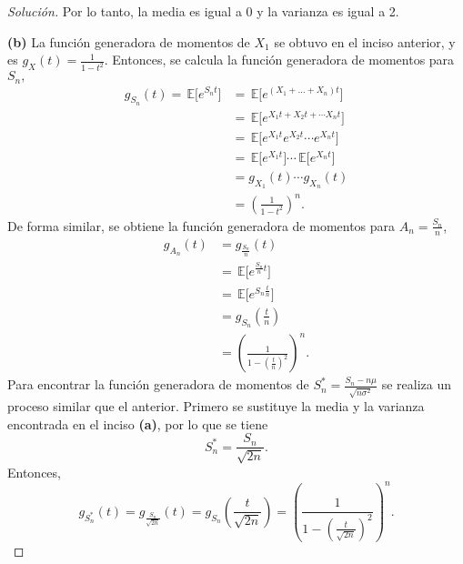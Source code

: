 \documentclass[12pt,letterpaper]{article}
\newcommand\esp[1]{\, \mathbb{E} \lbrack #1 \rbrack}
\begin{document}
\begin{proof}[Solución]
Por lo tanto, la media es igual a 0 y la varianza es igual a 2.

\textbf{(b)} La función generadora de momentos de $X_1$ se obtuvo en el inciso anterior, y es $g_X (t) = \frac{1}{1 - t^2}$. Entonces, se calcula la función generadora de momentos para $S_n,$ 
	\begin{align}
		g_{S_n} (t) = \esp{e^{S_n t}} &= \esp{e^{(X_1 + \dots + X_n) t}}\\
				&= \esp{e^{X_1 t+ X_2 t + \cdots X_n t}}\\
		&= \esp{e^{X_1 t} e^{X_2 t} \cdots e^{X_n t}} \\
		&= \esp{e^{X_1 t}} \cdots \esp{e^{X_n t}} \\
		&= g_{X_1} (t) \cdots g_{X_n} (t) \\
		&= \left(\frac{1}{1-t^2}\right)^{n}.
	\end{align}
De forma similar, se obtiene la función generadora de momentos para $A_n = \frac{S_n}{n}$,  
	\begin{align}
		g_{A_n} (t) &= g_{ \frac{S_n}{n}}(t) \\
		& = \esp{ e^{\frac{S_n}{n} t}} \\ &=  \esp{ e^{S_n \frac{t}{n}}}\\ &= g_{S_n} \left(\frac{t}{n}\right)\\
		&= \left( \frac{1}{1-\left(\frac{t}{n}\right)^2} \right)^n.
	\end{align}
	Para encontrar la función generadora de momentos de $S_{n}^{*} = \frac{S_n - n\mu}{\sqrt{n \sigma^2}}$ se realiza un proceso similar que el anterior. Primero se sustituye la media y la varianza encontrada en el inciso \textbf{(a)}, por lo que se tiene 
	\begin{equation}
	S_{n}^{*}  = \frac{S_n}{\sqrt{2 n}}.
	\end{equation}
Entonces,
	\begin{equation}
		g_{S_{n}^{*}} (t) = g_{\frac{S_n}{\sqrt{2n}}} (t)=  g_{S_n} \left(\frac{t}{\sqrt{2n}}\right) =  \left( \frac{1}{1-\left(\frac{t}{\sqrt{2n}}\right)^2} \right)^n.
	\end{equation}


\end{proof}
\end{document}
